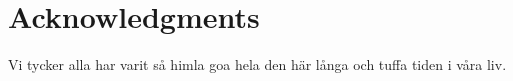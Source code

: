 \section*{Acknowledgments}

Vi tycker alla har varit så himla goa hela den här långa och tuffa tiden i våra liv.
